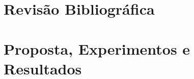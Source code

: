 \documentclass[
	12pt,				%
	openright,			%
	oneside,			%
	a4paper,			%
	english,			%
	brazil,				%
	inline,             %
	]{abntex2}
\begin{document}
\tableofcontents*
\cleardoublepage

\textual



\part{Revisão Bibliográfica}







%

\part{Proposta, Experimentos e Resultados}



%

% 

%

\postextual




%
%
\end{document}
